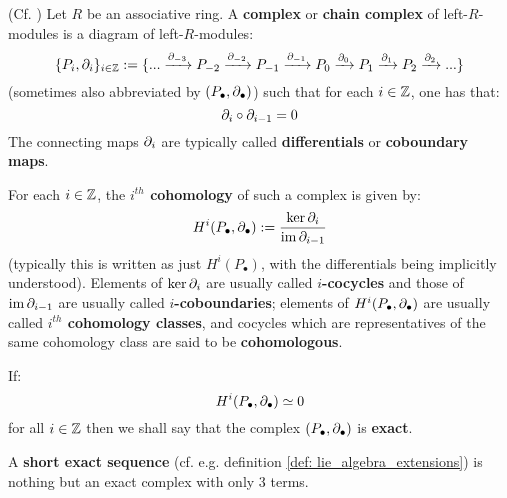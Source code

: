         \begin{definition} \label{def: complexes_and_cohomology}
            (Cf. \cite[Section IV.1]{hilton_stammbach_homological_algebra}) Let $R$ be an associative ring. A \textbf{complex} or \textbf{chain complex} of left-$R$-modules is a diagram of left-$R$-modules:
                $$\{P_i, \partial_i\}_{i \in \mathbb{Z}} := \{ ... \xrightarrow[]{\partial_{-3}} P_{-2} \xrightarrow[]{\partial_{-2}} P_{-1} \xrightarrow[]{\partial_{-1}} P_0 \xrightarrow[]{\partial_0} P_1 \xrightarrow[]{\partial_1} P_2 \xrightarrow[]{\partial_2} ... \}$$
            (sometimes also abbreviated by $(P_{\bullet}, \partial_{\bullet})$) such that for each $i \in \mathbb{Z}$, one has that:
                $$\partial_i \circ \partial_{i - 1} = 0$$
            The connecting maps $\partial_i$ are typically called \textbf{differentials} or \textbf{coboundary maps}.
            
            For each $i \in \mathbb{Z}$, the \textbf{$i^{th}$ cohomology} of such a complex is given by:
                $$H^i(P_{\bullet}, \partial_{\bullet}) := \frac{ \ker \partial_i }{ \operatorname{im} \partial_{i - 1} }$$
            (typically this is written as just $H^i(P_{\bullet})$, with the differentials being implicitly understood). Elements of $\ker \partial_i$ are usually called \textbf{$i$-cocycles} and those of $\operatorname{im} \partial_{i - 1}$ are usually called \textbf{$i$-coboundaries}; elements of $H^i(P_{\bullet}, \partial_{\bullet})$ are usually called \textbf{$i^{th}$ cohomology classes}, and cocycles which are representatives of the same cohomology class are said to be \textbf{cohomologous}.
            
            If:
                $$H^i(P_{\bullet}, \partial_{\bullet}) \simeq 0$$
            for all $i \in \mathbb{Z}$ then we shall say that the complex $(P_{\bullet}, \partial_{\bullet})$ is \textbf{exact}.
        \end{definition}
        \begin{example}
            A \textbf{short exact sequence} (cf. e.g. definition \ref{def: lie_algebra_extensions}) is nothing but an exact complex with only 3 terms. 
        \end{example}
        
